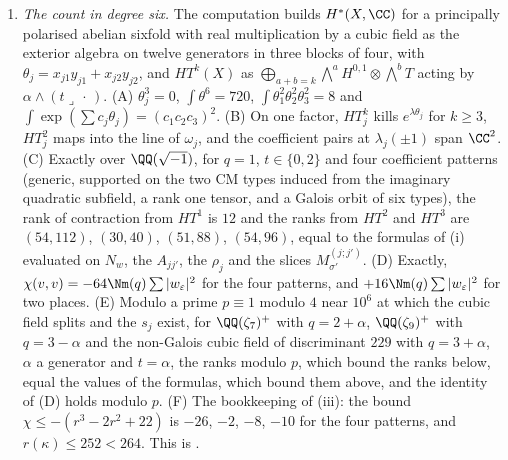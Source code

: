\begin{enumerate}[label=\textup{(\Roman*)},leftmargin=*]
  $\QQ(\sqrt{-1})$ and the quartic profile as controls; and the identities
  used in the proof of , on random integral classes.
  Further, for , the four identities at $n=1$ and $n=2$
  with $d$ a symbol; for , the Euler characteristic
  of a secant class and the numbers $R_{n}$ for $n\le12$; for
  , the dimensions of the $\SO(t)$- and $\mathrm{O}(t)$-invariants of $V^{\otimes j}$,
  equal for $j<t$ and differing by one at $j=t$, for $t\le8$, with the
  determinant invariant and odd under reflections; and for
  , the closure graph with the implication
  $\textup{(F3$'$)}\Rightarrow\textup{(M)}$ added, which has the same five
  minimal sufficient sets as the rule set of item (XXXIII).

\item \emph{The count in degree six.} The computation builds $H^{*}(X,\CC)$
  for a principally polarised abelian sixfold with real multiplication by a
  cubic field as the exterior algebra on twelve generators in three blocks of
  four, with $\theta_{j}=x_{j1}y_{j1}+x_{j2}y_{j2}$, and $HT^{k}(X)$ as
  $\bigoplus_{a+b=k}\bigwedge^{a}H^{0,1}\otimes\bigwedge^{b}T$ acting by
  $\alpha\wedge(t\lrcorner\,\cdot\,)$. (A) $\theta_{j}^{3}=0$,
  $\int\theta^{6}=720$, $\int\theta_{1}^{2}\theta_{2}^{2}\theta_{3}^{2}=8$ and
  $\int\exp(\sum c_{j}\theta_{j})=(c_{1}c_{2}c_{3})^{2}$. (B) On one factor,
  $HT^{k}_{j}$ kills $e^{\lambda\theta_{j}}$ for $k\ge3$, $HT^{2}_{j}$ maps
  into the line of $\omega_{j}$, and the coefficient pairs at
  $\lambda_{j}(\pm1)$ span $\CC^{2}$. (C) Exactly over $\QQ(\sqrt{-1})$, for
  $q=1$, $t\in\{0,2\}$ and four coefficient patterns (generic, supported on
  the two CM types induced from the imaginary quadratic subfield, a rank one
  tensor, and a Galois orbit of six types), the rank of contraction from
  $HT^{1}$ is $12$ and the ranks from $HT^{2}$ and $HT^{3}$ are $(54,112)$,
  $(30,40)$, $(51,88)$, $(54,96)$, equal to the formulas of (i) evaluated on
  $N_{w}$, the $A_{jj'}$, the $\rho_{j}$ and the slices $M^{(j;j')}_{\sigma'}$.
  (D) Exactly, $\chi(v,v)=-64\Nm(q)\sum|w_{\varepsilon}|^{2}$ for the four
  patterns, and $+16\Nm(q)\sum|w_{\varepsilon}|^{2}$ for two places. (E) Modulo
  a prime $p\equiv1$ modulo $4$ near $10^{6}$ at which the cubic field splits
  and the $s_{j}$ exist, for $\QQ(\zeta_{7})^{+}$ with $q=2+\alpha$,
  $\QQ(\zeta_{9})^{+}$ with $q=3-\alpha$ and the non-Galois cubic field of
  discriminant $229$ with $q=3+\alpha$, $\alpha$ a generator and $t=\alpha$,
  the ranks modulo $p$, which bound the ranks below, equal the values of the
  formulas, which bound them above, and the identity of (D) holds modulo
  $p$. (F) The bookkeeping of (iii): the bound
  $\chi\le-(r^{3}-2r^{2}+22)$ is $-26$, $-2$, $-8$, $-10$ for the four
  patterns, and $r(\kappa)\le252<264$. This is .


\end{enumerate}
